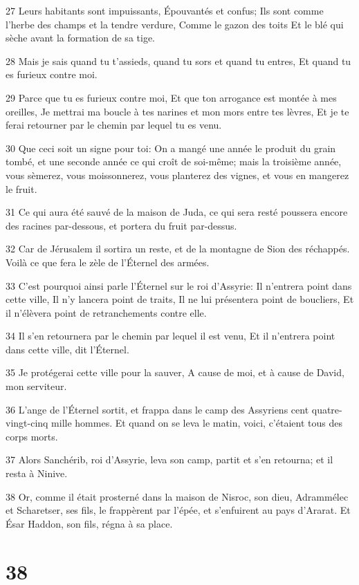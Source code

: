 \par 27 Leurs habitants sont impuissants, Épouvantés et confus; Ils sont comme l'herbe des champs et la tendre verdure, Comme le gazon des toits Et le blé qui sèche avant la formation de sa tige.
\par 28 Mais je sais quand tu t'assieds, quand tu sors et quand tu entres, Et quand tu es furieux contre moi.
\par 29 Parce que tu es furieux contre moi, Et que ton arrogance est montée à mes oreilles, Je mettrai ma boucle à tes narines et mon mors entre tes lèvres, Et je te ferai retourner par le chemin par lequel tu es venu.
\par 30 Que ceci soit un signe pour toi: On a mangé une année le produit du grain tombé, et une seconde année ce qui croît de soi-même; mais la troisième année, vous sèmerez, vous moissonnerez, vous planterez des vignes, et vous en mangerez le fruit.
\par 31 Ce qui aura été sauvé de la maison de Juda, ce qui sera resté poussera encore des racines par-dessous, et portera du fruit par-dessus.
\par 32 Car de Jérusalem il sortira un reste, et de la montagne de Sion des réchappés. Voilà ce que fera le zèle de l'Éternel des armées.
\par 33 C'est pourquoi ainsi parle l'Éternel sur le roi d'Assyrie: Il n'entrera point dans cette ville, Il n'y lancera point de traits, Il ne lui présentera point de boucliers, Et il n'élèvera point de retranchements contre elle.
\par 34 Il s'en retournera par le chemin par lequel il est venu, Et il n'entrera point dans cette ville, dit l'Éternel.
\par 35 Je protégerai cette ville pour la sauver, A cause de moi, et à cause de David, mon serviteur.
\par 36 L'ange de l'Éternel sortit, et frappa dans le camp des Assyriens cent quatre-vingt-cinq mille hommes. Et quand on se leva le matin, voici, c'étaient tous des corps morts.
\par 37 Alors Sanchérib, roi d'Assyrie, leva son camp, partit et s'en retourna; et il resta à Ninive.
\par 38 Or, comme il était prosterné dans la maison de Nisroc, son dieu, Adrammélec et Scharetser, ses fils, le frappèrent par l'épée, et s'enfuirent au pays d'Ararat. Et Ésar Haddon, son fils, régna à sa place.

\chapter{38}


